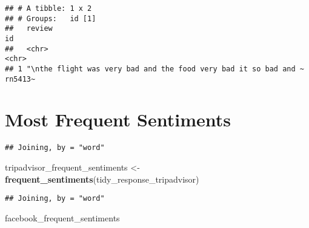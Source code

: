 \documentclass[]{article}
\newenvironment{Shaded}{\begin{snugshade}}{\end{snugshade}}
\newcommand{\KeywordTok}[1]{\textcolor[rgb]{0.13,0.29,0.53}{\textbf{#1}}}
\newcommand{\DataTypeTok}[1]{\textcolor[rgb]{0.13,0.29,0.53}{#1}}
\newcommand{\StringTok}[1]{\textcolor[rgb]{0.31,0.60,0.02}{#1}}
\newcommand{\OtherTok}[1]{\textcolor[rgb]{0.56,0.35,0.01}{#1}}
\newcommand{\ControlFlowTok}[1]{\textcolor[rgb]{0.13,0.29,0.53}{\textbf{#1}}}
\newcommand{\OperatorTok}[1]{\textcolor[rgb]{0.81,0.36,0.00}{\textbf{#1}}}
\newcommand{\NormalTok}[1]{#1}
\begin{document}
\begin{verbatim}
## # A tibble: 1 x 2
## # Groups:   id [1]
##   review                                                           id     
##   <chr>                                                            <chr>  
## 1 "\nthe flight was very bad and the food very bad it so bad and ~ rn5413~
\end{verbatim}

\section{Most Frequent Sentiments}\label{most-frequent-sentiments}

\begin{Shaded}
\end{Shaded}

\begin{verbatim}
## Joining, by = "word"
\end{verbatim}

\begin{Shaded}
\begin{Highlighting}[]
\NormalTok{tripadvisor_frequent_sentiments <-}\StringTok{ }\KeywordTok{frequent_sentiments}\NormalTok{(tidy_response_tripadvisor)}
\end{Highlighting}
\end{Shaded}

\begin{verbatim}
## Joining, by = "word"
\end{verbatim}

\begin{Shaded}
\begin{Highlighting}[]
\NormalTok{facebook_frequent_sentiments}
\end{Highlighting}
\end{Shaded}
\end{document}
